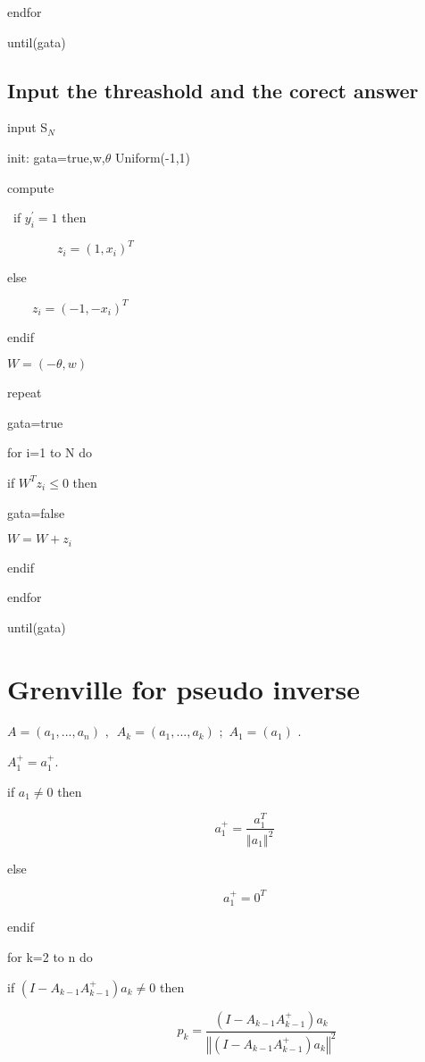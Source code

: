 \documentclass{article}
\begin{document}
\qquad endfor

until(gata)

\subsection{Input the threashold and the corect answer}

input S$_{N}$

init: gata=true,w,$\theta $ Uniform(-1,1)

compute

\qquad\ if $y_{i}^{\prime }=1$ then

$\qquad \qquad z_{i}=(1,x_{i})^{T}$

\qquad else

\qquad $\qquad z_{i}=(-1,-x_{i})^{T}$

\qquad endif

\qquad $W=(-\theta ,w)$

repeat

\qquad gata=true

\qquad for i=1 to N do

\qquad \qquad if $W^{T}z_{i}\leq 0$ then

\qquad \qquad \qquad gata=false

\qquad \qquad \qquad $W=W+z_{i}$

\qquad \qquad endif

\qquad endfor

until(gata)

\section{Grenville for pseudo inverse}

$A=(a_{1},...,a_{n})\,\,,\,\,\,A_{k}=(a_{1},...,a_{k})\,\,;\,\,A_{1}=(a_{1})$%
.

$A_{1}^{+}=a_{1}^{+}$.

if $a_{1}\neq 0$ then

\[
\qquad a_{1}^{+}=\frac{a_{1}^{T}}{\left\Vert a_{1}\right\Vert ^{2}} 
\]

else

\[
\qquad a_{1}^{+}=0^{T} 
\]

endif

for k=2 to n do

\qquad if $(I-A_{k-1}A_{k-1}^{+})a_{k}\neq 0$ then

\[
\qquad \qquad p_{k}=\frac{(I-A_{k-1}A_{k-1}^{+})a_{k}}{\left\Vert
(I-A_{k-1}A_{k-1}^{+})a_{k}\right\Vert ^{2}} 
\]
\end{document}
